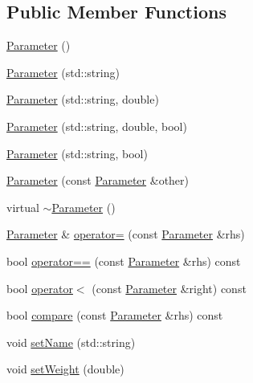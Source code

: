 \subsection*{Public Member Functions}
\begin{DoxyCompactItemize}
\item 
\mbox{\hyperlink{classanen_par_1_1_parameter_a5ba93ca36c3261d3850e67f92717c2f5}{Parameter}} ()
\item 
\mbox{\hyperlink{classanen_par_1_1_parameter_ae60c28faa4a7dafc4b1c10df2a14893d}{Parameter}} (std\+::string)
\item 
\mbox{\hyperlink{classanen_par_1_1_parameter_a1f69783ced66d2fe01414e724cabe7c6}{Parameter}} (std\+::string, double)
\item 
\mbox{\hyperlink{classanen_par_1_1_parameter_a2c0360abe051ca5ca67d812f75987918}{Parameter}} (std\+::string, double, bool)
\item 
\mbox{\hyperlink{classanen_par_1_1_parameter_ac5eef55d40acfe03a9a741c5606ef0fc}{Parameter}} (std\+::string, bool)
\item 
\mbox{\hyperlink{classanen_par_1_1_parameter_ad3f5d861da24673d97bd1bd206b0b89a}{Parameter}} (const \mbox{\hyperlink{classanen_par_1_1_parameter}{Parameter}} \&other)
\item 
virtual \mbox{\hyperlink{classanen_par_1_1_parameter_a6e2ade42a712f1d3675653329266e42d}{$\sim$\+Parameter}} ()
\item 
\mbox{\hyperlink{classanen_par_1_1_parameter}{Parameter}} \& \mbox{\hyperlink{classanen_par_1_1_parameter_a3bd55c637ccb3891e09cfa4a6bec91f5}{operator=}} (const \mbox{\hyperlink{classanen_par_1_1_parameter}{Parameter}} \&rhs)
\item 
bool \mbox{\hyperlink{classanen_par_1_1_parameter_ada4106ab9962e61d1aecf5bf032290c3}{operator==}} (const \mbox{\hyperlink{classanen_par_1_1_parameter}{Parameter}} \&rhs) const
\item 
bool \mbox{\hyperlink{classanen_par_1_1_parameter_a4f7b83d21a705a91947da01166c3f799}{operator$<$}} (const \mbox{\hyperlink{classanen_par_1_1_parameter}{Parameter}} \&right) const
\item 
bool \mbox{\hyperlink{classanen_par_1_1_parameter_adb0e139c6aeaedc4ee1e9432d464e9bc}{compare}} (const \mbox{\hyperlink{classanen_par_1_1_parameter}{Parameter}} \&rhs) const
\item 
void \mbox{\hyperlink{classanen_par_1_1_parameter_af399de059c88d2ae0b27afd3cb998261}{set\+Name}} (std\+::string)
\item 
void \mbox{\hyperlink{classanen_par_1_1_parameter_ad0682af0270bd689cfa0e571dd58138d}{set\+Weight}} (double)

\end{DoxyCompactItemize}
